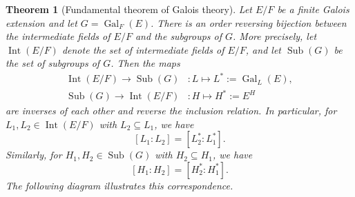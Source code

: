 \documentclass[10pt]{article}
\DeclareMathOperator{\Sub}{Sub}
\DeclareMathOperator{\Gal}{Gal}
\DeclareMathOperator{\Int}{Int}
\theoremstyle{newstyle}
\newtheorem{thm}{Theorem}[section]
\begin{document}
\begin{thm}[Fundamental theorem of Galois theory]
Let $E/F$ be a finite Galois extension and let $G = \Gal_F(E)$. There is an order reversing 
bijection between the intermediate fields of $E/F$ and the subgroups of $G$. 
More precisely, let $\Int(E/F)$ denote the set of intermediate fields of $E/F$, and 
let $\Sub(G)$ be the set of subgroups of $G$. Then the maps 
\begin{align*}
    \Int(E/F) \to \Sub(G) &: L \mapsto L^* := \Gal_L(E), \\
    \Sub(G) \to \Int(E/F) &: H \mapsto H^* := E^H
\end{align*}
are inverses of each other and reverse the inclusion relation. In particular, for $L_1, L_2 
\in \Int(E/F)$ with $L_2 \subseteq L_1$, we have 
\[ [L_1 : L_2] = [L_2^* : L_1^*]. \]
Similarly, for $H_1, H_2 \in \Sub(G)$ with $H_2 \subseteq H_1$, we have 
\[ [H_1 : H_2] = [H_2^* : H_1^*]. \]
The following diagram illustrates this correspondence.
\begin{center}

\begin{tikzpicture}[x=0.75pt,y=0.75pt,yscale=-1,xscale=1]


\end{tikzpicture}
\end{center}
\end{thm}
\end{document}
